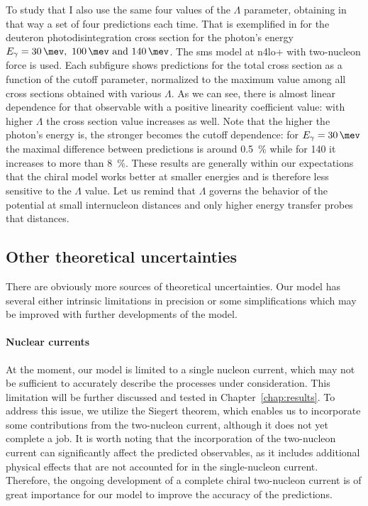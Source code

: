     To study that I also use the same four values of the $\Lambda$ parameter,
    obtaining in that way a set of four predictions each time.
    That is exemplified in   for the deuteron photodisintegration cross section for the
    photon's energy $E_\gamma = \SIlist{30;100;140}{\mev}$.
    The \gls{sms} model at \gls{n4lo+} with two-nucleon force is used.
    Each subfigure shows predictions for the total cross section as 
    a function of the cutoff parameter,
    normalized to the maximum value among all cross sections
    obtained with various $\Lambda$.
    As we can see, there is almost linear dependence for that observable with a positive linearity coefficient value:
    with higher $\Lambda$ the cross section value increases as well.
    Note that the higher the photon's energy is, the stronger becomes the cutoff dependence: for $E_\gamma=\SI{30}{\mev}$
    the maximal difference between predictions is around \SI{0.5}{\percent} while
    for \SI{140}{\mev} it increases to more than \SI{8}{\percent}.
    These results are generally within our expectations that the chiral model works better at
    smaller energies
    and is therefore less sensitive to the $\Lambda$ value. Let us remind that $\Lambda$ 
    governs the behavior of the potential at small internucleon distances and only higher energy transfer probes that distances. 



    \subsection*{Other theoretical uncertainties}

    There are obviously more sources of theoretical uncertainties. 
    Our model has several either intrinsic limitations in precision or 
    some simplifications which may be improved with further developments of the model.
    
    \paragraph{Nuclear currents}
    At the moment, our model is limited to a single nucleon current, which may not be sufficient to accurately describe the processes under consideration.  This limitation will be further discussed and tested in
    Chapter~\ref{chap:results}. To address this issue, we utilize the Siegert theorem, which enables us to
    incorporate some contributions from the two-nucleon current, although it does not yet complete a job.
    It is worth noting
    that the incorporation of the two-nucleon current can significantly affect the predicted observables, as it
    includes additional physical effects that are not accounted for in the single-nucleon current. Therefore, the
    ongoing development of a complete chiral two-nucleon current
    is of great importance for our model to improve the accuracy of the predictions.

